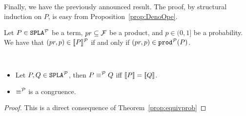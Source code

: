 Finally, we have the previously announced result. The proof, by structural induction on $P$, is easy from
Proposition~\ref{prop:DenoOpe}.


\bthm\label{prop:equivprob}
  Let $P\in\mathtt{SPLA{^{\cal P}}}$ be a term, $pr\subseteq{\cal F}$ be a product, and
  $p\in(0,1]$ be a probability. We have that $ (pr,p)\in[\![P]\!]^{\cal P}$ if and only if
  $(pr,p)\in\mathtt{prod}^{\cal P}(P)$.
\ethm

\begin{theorem}\mbox{ }
  \begin{itemize}
  \item Let $P,Q\in\mathtt{SPLA{^{\cal P}}}$, then $P\mathrel{\equiv^{\cal P}} Q$ iff
    $[\![P]\!]=[\![Q]\!]$.
  \item $\mathrel{\equiv^{\cal P}}$ is a congruence.
  \end{itemize}
  \begin{proof}
    This is a direct consequence of Theorem~\ref{prop:equivprob}
  \end{proof}
\end{theorem}


